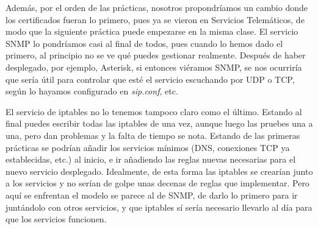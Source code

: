 \documentclass[]{article}
\begin{document}
               
               
Además, por el orden de las prácticas, nosotros propondríamos un cambio donde los certificados fueran lo primero, pues ya se vieron en Servicios Telemáticos, de modo que la siguiente práctica puede empezarse en la misma clase. El servicio SNMP lo pondríamos casi al final de todos, pues cuando lo hemos dado el primero, al principio no se ve qué puedes gestionar realmente. Después de haber desplegado, por ejemplo, Asterisk, si entonces viéramos SNMP, se nos ocurriría que sería útil para controlar que esté el servicio escuchando por UDP o TCP, según lo hayamos configurado en \textit{sip.conf}, etc.

El servicio de iptables no lo tenemos tampoco claro como el último. Estando al final puedes escribir todas las iptables de una vez, aunque luego las pruebes una a una, pero dan problemas y la falta de tiempo se nota. Estando de las primeras prácticas se podrían añadir los servicios mínimos (DNS, conexiones TCP ya establecidas, etc.) al inicio, e ir añadiendo las reglas nuevas necesarias para el nuevo servicio desplegado. Idealmente, de esta forma las iptables se crearían junto a los servicios y no serían de golpe unas decenas de reglas que implementar. Pero aquí se enfrentan el modelo se parece al de SNMP, de darlo lo primero para ir juntándolo con otros servicios, y que iptables sí sería necesario llevarlo al día para que los servicios funcionen.
\end{document}
